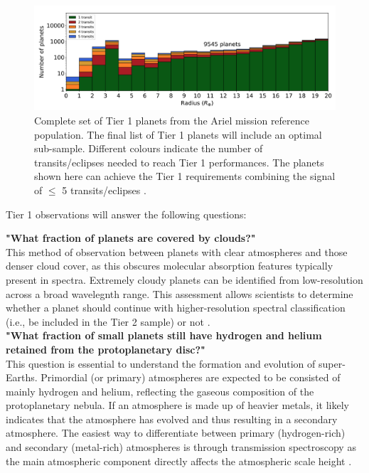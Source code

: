 \documentclass[12pt]{article}
\begin{document}
\begin{figure}[b]
    \centering
    \includegraphics[width=.9\textwidth]{tier 1 transit graph.png}
    \caption{Complete set of Tier 1 planets from the Ariel mission reference population. The final list of Tier 1 planets will include an optimal sub-sample. Different colours indicate the number of transits/eclipses needed to reach
    Tier 1 performances. The planets shown here can achieve the Tier 1 requirements combining the signal of $\leq$ 5 transits/eclipses \protect\cite{zingales2018ariel}.}
    \label{fig:3}
\end{figure}

Tier 1 observations will answer the following questions:

\textbf{"What fraction of planets are covered by clouds?"}\\
This method of observation between planets with clear atmospheres and those denser cloud cover, as this obscures molecular absorption features typically present in spectra.
Extremely cloudy planets can be identified from low-resolution across a broad wavelegnth range. This assessment allows scientists to determine whether a planet should continue with higher-resolution spectral classification
(i.e., be included in the Tier 2 sample) or not \cite{salvignol2024ariel}.\\

\textbf{"What fraction of small planets still have hydrogen and helium retained from the protoplanetary disc?"}\\
This question is essential to understand the formation and evolution of super-Earths. Primordial (or primary) atmospheres are expected to be consisted of mainly hydrogen and helium,
reflecting the gaseous composition of the protoplanetary nebula. If an atmosphere is made up of heavier metals, it likely indicates that the atmosphere has evolved and thus resulting in a secondary atmosphere.
The easiest way to differentiate between primary (hydrogen-rich) and secondary (metal-rich) atmospheres is through transmission spectroscopy as the main atmospheric component directly affects the atmospheric scale height \cite{salvignol2024ariel}. \\
\end{document}
